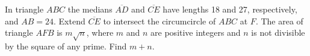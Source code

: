 In triangle $ ABC$ the medians $ \overline{AD}$ and $ \overline{CE}$ have lengths 18 and 27, respectively, and $ AB = 24$.  Extend $ \overline{CE}$ to intersect the circumcircle of $ ABC$ at $ F$.  The area of triangle $ AFB$ is $ m\sqrt {n}$, where $ m$ and $ n$ are positive integers and $ n$ is not divisible by the square of any prime.  Find $ m + n$.